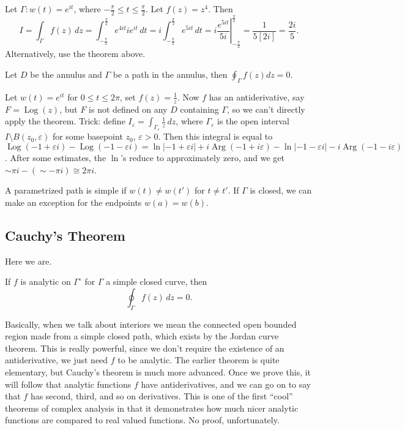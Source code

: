 \begin{example}
    Let $\Gamma \colon w(t)=e^{it}$, where $-\frac{\pi}{2}\leq t \leq \frac{\pi}{2}$. Let $f(z)=z^4$. Then \[
        I=\int_{\Gamma }^{} f(z) \, dz=\int_{-\frac{\pi}{2}}^{\frac{\pi}{2}}e^{4it}ie^{it}  \, dt=i \int_{-\frac{\pi}{2}}^{\frac{\pi}{2}} e^{5it} \, dt= \left.i \frac{e^{5it}}{5i}  \right|_{-\frac{\pi}{2}}^{\frac{\pi}{2}}=\frac{1}{5[2i]}=\frac{2i}{5}.
    \] Alternatively, use the theorem above.
\end{example}
\begin{example}
    Let $D$ be the annulus and $\Gamma $ be a path in the annulus, then $\oint_{\Gamma }f(z)dz=0$.
\end{example}
\begin{example}
    Let $w(t)=e^{it}$ for $0\leq t \leq 2\pi$, set $f(z)=\frac{1}{z}$. Now $f$ has an antiderivative, say $F=\operatorname{Log}(z)$, but $F$ is not defined on any $D$ containing $\Gamma $, so we can't directly apply the theorem. Trick: define $I_{\varepsilon }=\int_{\Gamma _{\varepsilon }}^{} \frac{1}{z} \, dz$, where $\Gamma _{\varepsilon }$ is the open interval $I\setminus B(z_0,\varepsilon )$ for some basepoint $z_0$, $\varepsilon >0$. Then this integral is equal to $\operatorname{Log}(-1+\varepsilon i)-\operatorname{Log}(-1-\varepsilon i)=\ln |-1+\varepsilon i|+i\operatorname{Arg}(-1+i\varepsilon ) - \ln|-1-\varepsilon i|-i \operatorname{Arg}(-1-i\varepsilon )$. After some estimates, the $\ln$'s reduce to approximately zero, and we get $\sim \pi i -(\sim -\pi i)\cong 2\pi i $.
\end{example}
\begin{definition}
    A parametrized path is simple if $w(t)\neq w(t')$ for $t\neq t'$. If $\Gamma $ is closed, we can make an exception for the endpoints $w(a)=w(b)$.
\end{definition}
\subsection{Cauchy's Theorem}
Here we are.
\begin{theorem}
   If $f$ is analytic on $\Gamma ^{\circ }$ for $\Gamma $ a simple closed curve, then \[
       \oint_{\Gamma }^{} f(z) \, dz=0. 
   \] 
\end{theorem}
Basically, when we talk about interiors we mean the connected open bounded region made from a simple closed path, which exists by the Jordan curve theorem. This is really powerful, since we don't require the existence of an antiderivative, we just need $f$ to be analytic. The earlier theorem is quite elementary, but Cauchy's theorem is much more advanced. Once we prove this, it will follow that analytic functions $f$ have antiderivatives, and we can go on to say that $f$ has second, third, and so on derivatives. This is one of the first ``cool'' theorems of complex analysis in that it demonstrates how much nicer analytic functions are compared to real valued functions. No proof, unfortunately.

